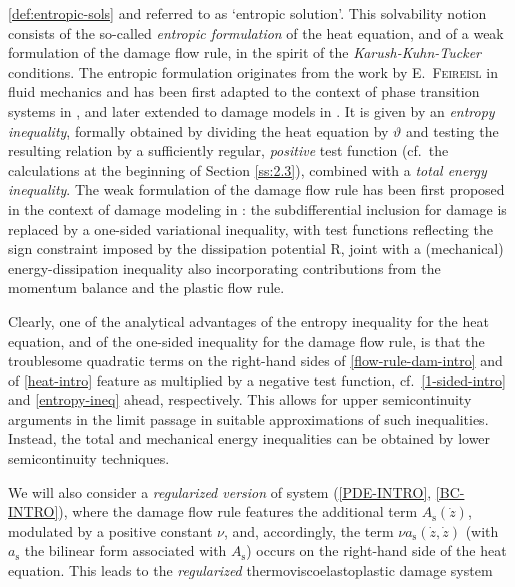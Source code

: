 \documentclass[a4paper,10pt,reqno]{amsart}
\numberwithin{equation}{section}
\numberwithin{equation}{section}
\newcommand{\teta}{\vartheta}
\newcommand{\didname}{\mathrm{R}}
\newcommand{\As}{A_{\mathrm{s}}}
\newcommand{\ass}{a_{\mathrm{s}}}
\newcommand{\EEE}{\color{black}}
\newcommand{\MMM}{\color{black}}%
\begin{document}
 \ref{def:entropic-sols} and referred to as `entropic solution'. This solvability notion 
  consists of the so-called \emph{entropic formulation} of the heat equation, and  of a weak formulation of the damage flow rule, in the spirit of the \emph{Karush-Kuhn-Tucker} conditions. The entropic formulation originates from the work by \textsc{E.\ Feireisl} in fluid mechanics \cite{Feireisl2007} and has been first adapted to the context of phase transition systems in \cite{FPR09}, and later extended to damage models in \cite{Rocca-Rossi}. It is given by an \emph{entropy inequality}, formally obtained by dividing  the heat equation by $\teta$ and testing the resulting relation by  a sufficiently regular, \emph{positive} test function (cf.\ the calculations at the beginning of Section \ref{ss:2.3}), combined with a \emph{total energy inequality}.  The weak formulation of the damage flow rule has been first proposed in the context of damage modeling in 
 \cite{HeiKra-1,HeiKra-2}: the subdifferential inclusion for damage is replaced by a one-sided variational inequality, with test functions reflecting  the sign constraint imposed by the dissipation potential $\didname$,
 joint with a (mechanical) energy-dissipation inequality also incorporating contributions from the momentum balance and the plastic flow rule.
\par
Clearly, one of the analytical advantages of the entropy inequality for the heat equation, and of the one-sided inequality for the damage flow rule, is that
  the troublesome quadratic terms on the right-hand sides of \eqref{flow-rule-dam-intro} and of \eqref{heat-intro}
feature as multiplied by a negative test function, \MMM cf.\ \eqref{1-sided-intro} and \eqref{entropy-ineq} ahead, respectively. \EEE  This  allows for upper semicontinuity arguments in the limit passage in  suitable
approximations of such inequalities. 
 Instead,  the total and mechanical energy inequalities can be obtained by lower semicontinuity techniques. 
 \par
 We will also consider a 
\emph{regularized version} of system (\ref{PDE-INTRO}, \ref{BC-INTRO}), where the damage flow rule features the additional term $\As(\dot z)$, modulated by a positive constant $\nu$, and, accordingly, the term $\nu \ass(\dot z, \dot z) $ 
(with $\ass $ the bilinear form associated with $\As$) occurs on the right-hand side of  the heat equation. This leads to 
  the \emph{regularized} thermoviscoelastoplastic damage system
\end{document}
